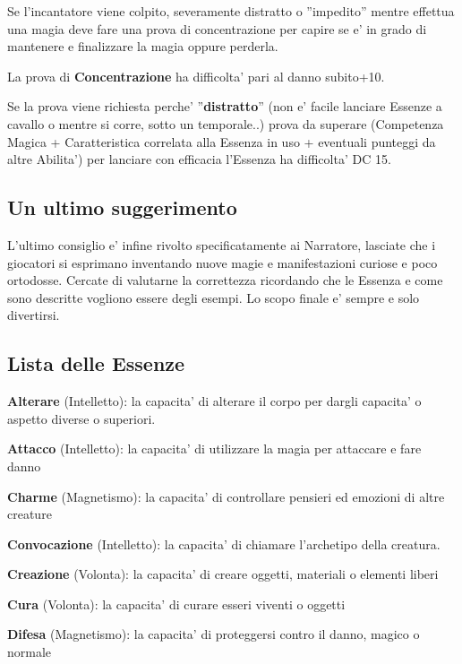 \documentclass[a4paper,11pt,twoside,openany]{book}
\begin{document}
	Se l'incantatore viene colpito, severamente distratto o ''impedito'' mentre effettua una magia deve fare una prova di concentrazione per capire se e' in grado di mantenere e finalizzare la magia oppure perderla.
	
	La prova di \textbf{Concentrazione} ha difficolta' pari al danno subito+10.
	
	Se la prova viene richiesta perche' ''\textbf{distratto}'' (non e' facile lanciare Essenze a cavallo o mentre si corre, sotto un temporale..) prova da superare (Competenza Magica + Caratteristica correlata alla Essenza in uso + eventuali punteggi da altre Abilita') per lanciare con efficacia l'Essenza ha difficolta' DC 15.
	
	\subsection{Un ultimo suggerimento}
	
	L'ultimo consiglio e' infine rivolto specificatamente ai Narratore, lasciate che i giocatori si esprimano inventando nuove magie e manifestazioni curiose e poco ortodosse. Cercate di valutarne la correttezza ricordando che le Essenza e come sono descritte vogliono essere degli esempi. Lo scopo finale e' sempre e solo divertirsi.
	
	\subsection{Lista delle Essenze}
	
	\textbf{Alterare} (Intelletto): la capacita' di alterare il corpo per dargli capacita' o aspetto diverse o superiori.
	
	\textbf{Attacco} (Intelletto): la capacita' di utilizzare la magia per attaccare e fare danno
	
	\textbf{Charme} (Magnetismo): la capacita' di controllare pensieri
	ed emozioni di altre creature
	
	\textbf{Convocazione} (Intelletto): la capacita' di chiamare l'archetipo
	della creatura.
	
	\textbf{Creazione} (Volonta): la capacita' di creare oggetti, materiali o elementi liberi
	
	\textbf{Cura} (Volonta): la capacita' di curare esseri viventi o oggetti
	
	\textbf{Difesa} (Magnetismo): la capacita' di proteggersi contro il danno, magico o normale
	
\end{document}
